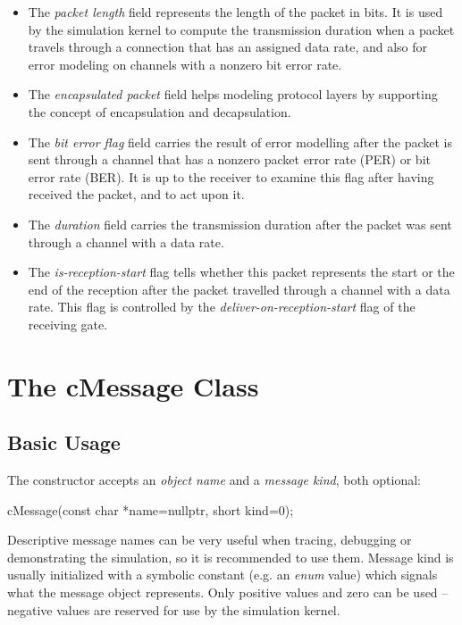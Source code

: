 \begin{itemize}
  \item The \textit{packet length} field represents the length of the packet
    in bits. It is used by the simulation kernel to compute the transmission
    duration when a packet travels through a connection that has an assigned
    data rate, and also for error modeling on channels with a nonzero
    bit error rate.
  \item The \textit{encapsulated packet} field helps modeling protocol layers
    by supporting the concept of encapsulation and decapsulation.
  \item The \textit{bit error flag} field carries the result of error
    modelling after the packet is sent through a channel that has a nonzero
    packet error rate (PER) or bit error rate (BER). It is up to the receiver
    to examine this flag after having received the packet, and to act upon it.
  \item The \textit{duration} field carries the transmission duration after
    the packet was sent through a channel with a data rate.
  \item The \textit{is-reception-start} flag tells whether this packet
    represents the start or the end of the reception after the packet travelled
    through a channel with a data rate. This flag is controlled by the
    \textit{deliver-on-reception-start} flag of the receiving gate.
\end{itemize}


\section{The cMessage Class}
\label{sec:msgs:cmessage}

\subsection{Basic Usage}
\label{sec:messages:cmessage-basic-usage}

The  constructor accepts an \textit{object name}
and a \textit{message kind}, both optional:

\begin{cpp}
cMessage(const char *name=nullptr, short kind=0);
\end{cpp}

Descriptive message names can be very useful when tracing, debugging or
demonstrating the simulation, so it is recommended to use them.
Message kind is usually initialized with a symbolic constant
(e.g. an \textit{enum} value) which signals what the message object
represents. Only positive values and zero can be used --
negative values are reserved for use by the simulation kernel.

